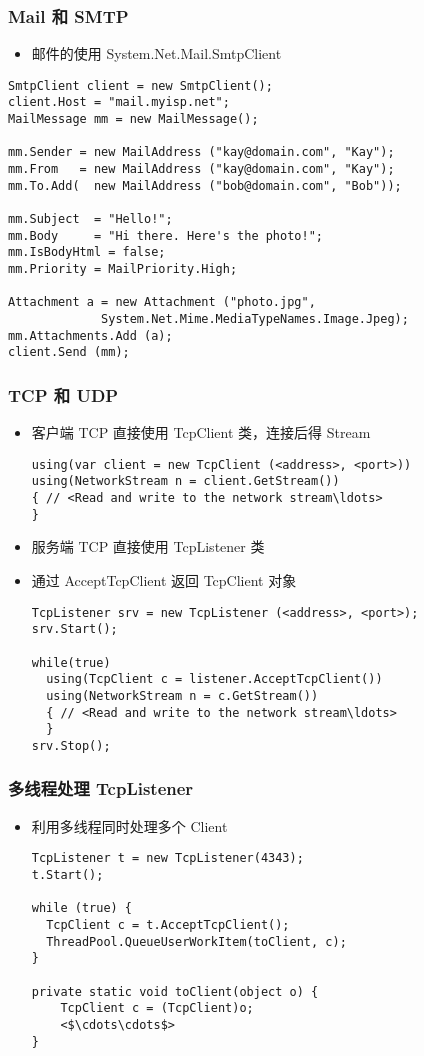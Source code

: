 \begin{frame}[fragile]
\frametitle{Mail 和 SMTP}

\begin{itemize}
\item 邮件的使用 System.Net.Mail.SmtpClient
\end{itemize}
\begin{lstlisting}
SmtpClient client = new SmtpClient();
client.Host = "mail.myisp.net";
MailMessage mm = new MailMessage();

mm.Sender = new MailAddress ("kay@domain.com", "Kay");
mm.From   = new MailAddress ("kay@domain.com", "Kay");
mm.To.Add(  new MailAddress ("bob@domain.com", "Bob"));

mm.Subject  = "Hello!";
mm.Body     = "Hi there. Here's the photo!";
mm.IsBodyHtml = false;
mm.Priority = MailPriority.High;

Attachment a = new Attachment ("photo.jpg",
             System.Net.Mime.MediaTypeNames.Image.Jpeg);
mm.Attachments.Add (a);
client.Send (mm);
\end{lstlisting}
\end{frame}

\begin{frame}[fragile]
\frametitle{TCP 和 UDP}
\begin{itemize}
\item 客户端 TCP 直接使用 TcpClient 类，连接后得 Stream
\begin{lstlisting}[escapeinside=<>]
using(var client = new TcpClient (<address>, <port>))
using(NetworkStream n = client.GetStream())
{ // <Read and write to the network stream\ldots>
}
\end{lstlisting}
\item 服务端 TCP 直接使用 TcpListener 类
\item 通过 AcceptTcpClient 返回 TcpClient 对象
\begin{lstlisting}[escapeinside=<>]
TcpListener srv = new TcpListener (<address>, <port>);
srv.Start();

while(true)
  using(TcpClient c = listener.AcceptTcpClient())
  using(NetworkStream n = c.GetStream())
  { // <Read and write to the network stream\ldots>
  }
srv.Stop();
\end{lstlisting}
\end{itemize} 
\end{frame}

\begin{frame}[fragile]
\frametitle{多线程处理 TcpListener}
\begin{itemize}
\item 利用多线程同时处理多个 Client 
\begin{lstlisting}[escapeinside=<>]
TcpListener t = new TcpListener(4343);
t.Start();

while (true) {
  TcpClient c = t.AcceptTcpClient();
  ThreadPool.QueueUserWorkItem(toClient, c);
}

private static void toClient(object o) {
    TcpClient c = (TcpClient)o;
    <$\cdots\cdots$>
}
\end{lstlisting}
\end{itemize}
\end{frame}

